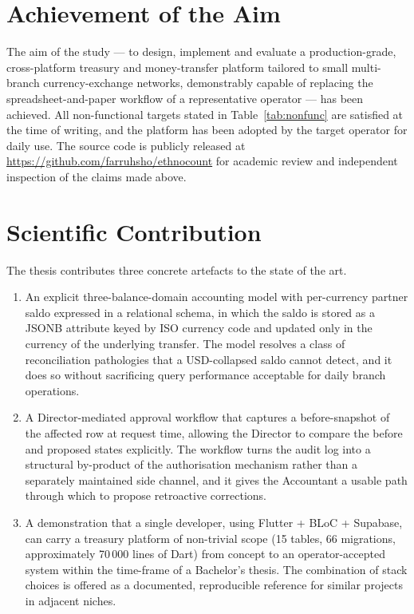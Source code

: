 \section*{Achievement of the Aim}
The aim of the study --- to design, implement and evaluate a production-grade, cross-platform treasury and money-transfer platform tailored to small multi-branch currency-exchange networks, demonstrably capable of replacing the spreadsheet-and-paper workflow of a representative operator --- has been achieved. All non-functional targets stated in Table~\ref{tab:nonfunc} are satisfied at the time of writing, and the platform has been adopted by the target operator for daily use. The source code is publicly released at \url{https://github.com/farruhsho/ethnocount} for academic review and independent inspection of the claims made above.

\section*{Scientific Contribution}
The thesis contributes three concrete artefacts to the state of the art.

\begin{enumerate}[leftmargin=1.2cm]
  \item An explicit three-balance-domain accounting model with per-currency partner saldo expressed in a relational schema, in which the saldo is stored as a JSONB attribute keyed by ISO currency code and updated only in the currency of the underlying transfer. The model resolves a class of reconciliation pathologies that a USD-collapsed saldo cannot detect, and it does so without sacrificing query performance acceptable for daily branch operations.
  \item A Director-mediated approval workflow that captures a before-snapshot of the affected row at request time, allowing the Director to compare the before and proposed states explicitly. The workflow turns the audit log into a structural by-product of the authorisation mechanism rather than a separately maintained side channel, and it gives the Accountant a usable path through which to propose retroactive corrections.
  \item A demonstration that a single developer, using Flutter + BLoC + Supabase, can carry a treasury platform of non-trivial scope (15 tables, 66 migrations, approximately 70\,000 lines of Dart) from concept to an operator-accepted system within the time-frame of a Bachelor's thesis. The combination of stack choices is offered as a documented, reproducible reference for similar projects in adjacent niches.
\end{enumerate}

